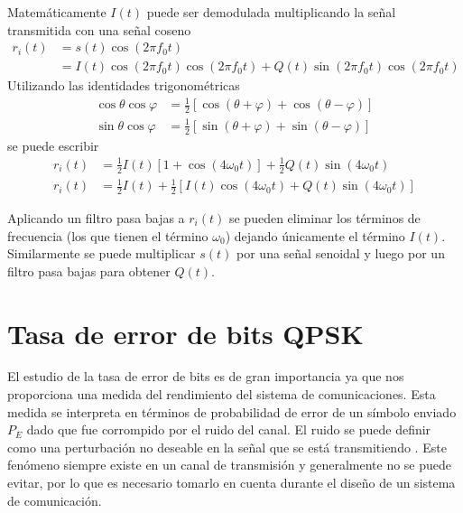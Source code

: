 Matem\'aticamente $I(t)$ puede ser demodulada multiplicando la se\~nal transmitida
con una se\~nal coseno
\begin{equation}
\begin{aligned}
r_i(t)&=s(t)\cos(2\pi f_0t)\\
&=I(t)\cos(2\pi f_0t)\cos(2\pi f_0t)+Q(t)\sin(2\pi f_0t)\cos(2\pi f_0t)
\end{aligned}
\end{equation}
Utilizando las identidades trigonom\'etricas
\begin{equation}
\begin{aligned}
\cos\theta\cos\varphi&=\frac{1}{2}[\cos(\theta+\varphi)+\cos(\theta-\varphi)]\\
\sin\theta\cos\varphi&=\frac{1}{2}[\sin(\theta+\varphi)+\sin(\theta-\varphi)]
\end{aligned}
\end{equation}
se puede escribir
\begin{equation}
\begin{aligned}
r_i(t)&=\frac{1}{2}I(t)[1+\cos(4\omega_0t)]+\frac{1}{2}Q(t)\sin(4\omega_0t)\\
r_i(t)&=\frac{1}{2}I(t)+\frac{1}{2}[I(t)\cos(4\omega_0t)+Q(t)\sin(4\omega_0t)]
\end{aligned}
\end{equation}

Aplicando un filtro pasa bajas a $r_i(t)$ se pueden eliminar los t\'erminos de
frecuencia (los que tienen el t\'ermino $\omega_0$) dejando \'unicamente el
t\'ermino $I(t)$. Similarmente se puede multiplicar $s(t)$ por una se\~nal
senoidal y luego por un filtro pasa bajas para obtener $Q(t)$.

\section{Tasa de error de bits QPSK}
El estudio de la tasa de error de bits es de gran importancia ya que nos proporciona una medida del
rendimiento del sistema de comunicaciones. Esta medida se interpreta en t\'erminos de probabilidad de
error de un s\'imbolo enviado $P_E$ dado que fue corrompido por el ruido del canal. El ruido se puede
definir como una perturbaci\'on no deseable en la se\~nal que se est\'a transmitiendo \cite{sklar}. Este fen\'omeno
siempre existe en un canal de transmisi\'on y generalmente no se puede evitar, por lo que es
necesario tomarlo en cuenta durante el dise\~no de un sistema de comunicaci\'on.

